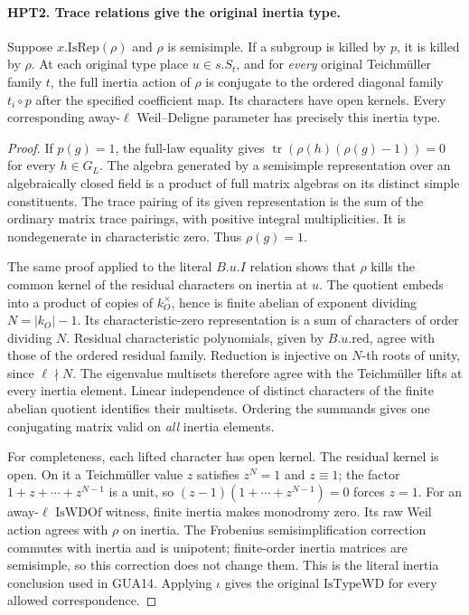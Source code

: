 \paragraph{HPT2. Trace relations give the original inertia type.}
\label{claim:HPT2}
Suppose $x.\mathrm{IsRep}(\rho)$ and $\rho$ is semisimple.  If a
subgroup is killed by $p$, it is killed by $\rho$.  At each original
type place $u\in s.S_t$, and for \emph{every} original Teichm\"uller
family $t$, the full inertia action of $\rho$ is conjugate to the
ordered diagonal family $t_i\circ p$ after the specified coefficient
map.  Its characters have open kernels.  Every corresponding
away-$\ell$ Weil--Deligne parameter has precisely this inertia type.
\begin{proof}
If $p(g)=1$, the full-law equality gives
$\operatorname{tr}(\rho(h)(\rho(g)-1))=0$ for every $h\in G_L$.
The algebra generated by a semisimple representation over an
algebraically closed field is a product of full matrix algebras on
its distinct simple constituents.  The trace pairing of its given
representation is the sum of the ordinary matrix trace pairings,
with positive integral multiplicities.  It is nondegenerate in
characteristic zero.  Thus $\rho(g)=1$.

The same proof applied to the literal $B.u.I$ relation shows that
$\rho$ kills the common kernel of the residual characters on
inertia at $u$.  The quotient embeds into a product of copies of
$k_O^\times$, hence is finite abelian of exponent dividing
$N=|k_O|-1$.  Its characteristic-zero representation is a sum of
characters of order dividing $N$.  Residual characteristic
polynomials, given by $B.u.\mathrm{red}$, agree with those of the
ordered residual family.  Reduction is injective on $N$-th roots
of unity, since $\ell\nmid N$.  The eigenvalue multisets therefore
agree with the Teichm\"uller lifts at every inertia element.
Linear independence of distinct characters of the finite abelian
quotient identifies their multisets.  Ordering the summands gives
one conjugating matrix valid on \emph{all} inertia elements.

For completeness, each lifted character has open kernel.  The
residual kernel is open.  On it a Teichm\"uller value $z$ satisfies
$z^N=1$ and $z\equiv1$; the factor $1+z+\cdots+z^{N-1}$ is a unit,
so $(z-1)(1+\cdots+z^{N-1})=0$ forces $z=1$.
For an away-$\ell$ $\mathrm{IsWDOf}$ witness, finite inertia makes
monodromy zero.  Its raw Weil action agrees with $\rho$ on inertia.
The Frobenius semisimplification correction commutes with inertia
and is unipotent; finite-order inertia matrices are semisimple,
so this correction does not change them.  This is the literal
inertia conclusion used in GUA14.  Applying $\iota$ gives the
original $\mathrm{IsTypeWD}$ for every allowed correspondence.
\end{proof}

